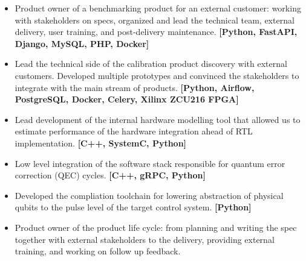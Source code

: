 \documentclass[10pt,a4paper,ragged2e,withhyper]{altacv}
\begin{document}
\begin{paracol}{2}



\begin{itemize}

    \item
    Product owner of a benchmarking product for an external customer:
    working with stakeholders on specs, organized and lead the technical team,
    external delivery, user training, and post-delivery maintenance.
    {\bf [Python, FastAPI, Django, MySQL, PHP, Docker]}
    
    \item
    Lead the technical side of the calibration product discovery with external
    customers.
    Developed multiple prototypes and convinced the stakeholders to integrate
    with the main stream of products.
    {\bf [Python, Airflow, PostgreSQL, Docker, Celery, Xilinx ZCU216 FPGA]}
    
    \item
    Lead development of the internal hardware modelling tool that allowed us
    to estimate performance of the hardware integration ahead of RTL implementation.
    {\bf [C++, SystemC, Python]}

    \item
    Low level integration of the software stack responsible for quantum error
    correction (QEC) cycles.
    {\bf [C++, gRPC, Python]}
    
    \item
    Developed the compliation toolchain for lowering abstraction of physical
    qubits to the pulse level of the target control system.
    {\bf [Python]}
    
    \item
    Product owner of the product life cycle: from planning
    and writing the spec together with external stakeholders to the delivery,
    providing external training, and working on follow up feedback.
    

\end{itemize}
\end{paracol}
\end{document}
